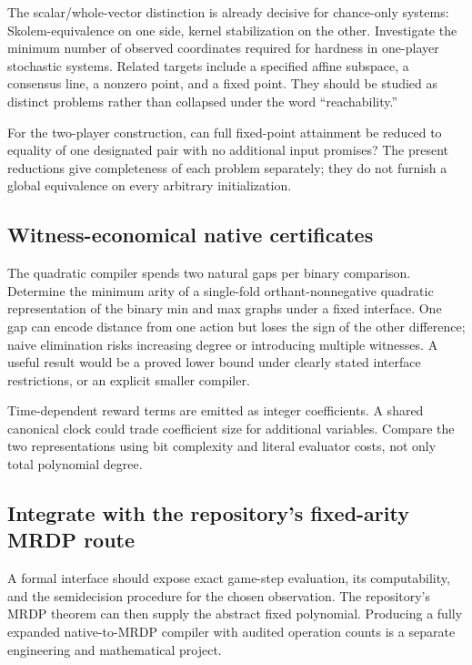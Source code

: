 \documentclass[11pt,letterpaper]{article}
\theoremstyle{definition}
\theoremstyle{remark}
\begin{document}
The scalar/whole-vector distinction is already decisive for chance-only
systems: Skolem-equivalence on one side, kernel stabilization on the other.
Investigate the minimum number of observed coordinates required for
hardness in one-player stochastic systems. Related targets include a
specified affine subspace, a consensus line, a nonzero point, and a
fixed point. They should be studied as distinct problems rather than
collapsed under the word ``reachability.''

For the two-player construction, can full fixed-point attainment be reduced
to equality of one designated pair with no additional input promises?
The present reductions give completeness of each problem separately;
they do not furnish a global equivalence on every arbitrary initialization.

\subsection{Witness-economical native certificates}\label{ste:ec:q:economical}

The quadratic compiler spends two natural gaps per binary comparison.
Determine the minimum arity of a single-fold orthant-nonnegative quadratic
representation of the binary min and max graphs under a fixed interface.
One gap can encode distance from one action but loses the sign of the
other difference; naive elimination risks increasing degree or introducing
multiple witnesses. A useful result would be a proved lower bound under
clearly stated interface restrictions, or an explicit smaller compiler.

Time-dependent reward terms are emitted as integer coefficients. A
shared canonical clock could trade coefficient size for additional
variables. Compare the two representations using bit complexity and
literal evaluator costs, not only total polynomial degree.

\subsection{Integrate with the repository's fixed-arity MRDP route}\label{ste:ec:q:mrdp}

A formal interface should expose exact game-step evaluation, its
computability, and the semidecision procedure for the chosen observation.
The repository's MRDP theorem can then supply the abstract fixed polynomial.
Producing a fully expanded native-to-MRDP compiler with audited operation
counts is a separate engineering and mathematical project.
\end{document}
